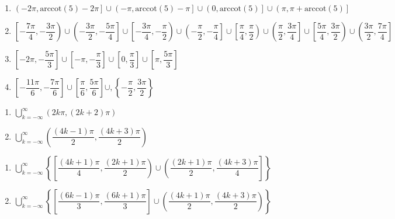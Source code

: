 \begin{enumerate}

\setcounter{enumi}{\value{HW}}

\item  $\left(-2\pi, \text{arccot}(5) - 2\pi\right] \cup \left(-\pi, \text{arccot}(5) - \pi\right] \cup \left(0, \text{arccot}(5)\right] \cup \left(\pi, \pi + \text{arccot}(5)\right]$

\item \scriptsize $\left[ -\dfrac{7\pi}{4}, -\dfrac{3\pi}{2} \right) \cup \left( -\dfrac{3\pi}{2}, -\dfrac{5\pi}{4} \right] \cup \left[ -\dfrac{3\pi}{4}, -\dfrac{\pi}{2} \right) \cup \left( -\dfrac{\pi}{2}, -\dfrac{\pi}{4} \right] \cup \left[ \dfrac{\pi}{4}, \dfrac{\pi}{2} \right) \cup \left( \dfrac{\pi}{2}, \dfrac{3\pi}{4} \right] \cup \left[ \dfrac{5\pi}{4}, \dfrac{3\pi}{2} \right) \cup \left( \dfrac{3\pi}{2}, \dfrac{7\pi}{4} \right]$ \normalsize

\item $\left[ -2\pi, -\dfrac{5\pi}{3} \right] \cup \left[ -\pi, -\dfrac{\pi}{3} \right] \cup \left[ 0, \dfrac{\pi}{3} \right] \cup \left[ \pi, \dfrac{5\pi}{3} \right]$

\item $\left[ -\dfrac{11\pi}{6},  -\dfrac{7\pi}{6} \right] \cup \left[ \dfrac{\pi}{6}, \dfrac{5\pi}{6} \right] \cup, \left\{ -\dfrac{\pi}{2}, \dfrac{3\pi}{2} \right\}$

\setcounter{HW}{\value{enumi}}

\end{enumerate}

\begin{multicols}{2}

\begin{enumerate}

\setcounter{enumi}{\value{HW}}

\item $\displaystyle \bigcup_{k=-\infty}^{\infty} \left( 2k\pi, (2k+2)\pi \right)$
\item $\displaystyle \bigcup_{k=-\infty}^{\infty} \left( \dfrac{(4k - 1)\pi}{2}, \dfrac{(4k + 3)\pi}{2} \right)$

\setcounter{HW}{\value{enumi}}

\end{enumerate}

\end{multicols}

\begin{enumerate}

\setcounter{enumi}{\value{HW}}

\item $\displaystyle \bigcup_{k=-\infty}^{\infty} \left\{ \left[ \dfrac{(4k + 1)\pi}{4}, \dfrac{(2k + 1)\pi}{2} \right) \cup \left( \dfrac{(2k + 1)\pi}{2}, \dfrac{(4k + 3)\pi}{4} \right] \right\}$

\item $\displaystyle \bigcup_{k=-\infty}^{\infty} \left\{ \left[ \dfrac{(6k - 1)\pi}{3}, \dfrac{(6k + 1)\pi}{3} \right] \cup \left( \dfrac{(4k + 1)\pi}{2}, \dfrac{(4k + 3)\pi}{2} \right) \right\}$

\setcounter{HW}{\value{enumi}}

\end{enumerate}

